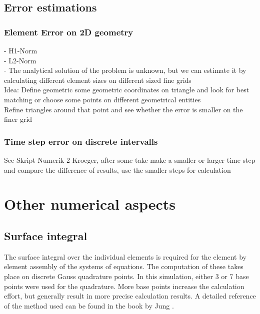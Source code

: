 \documentclass[parskip=half, titlepage=yes, 12pt, BCOR=12mm, DIV=calc]{scrartcl}
\begin{document}
\subsection{Error estimations}

\subsubsection{Element Error on 2D geometry}
- H1-Norm \\
- L2-Norm \\

- The analytical solution of the problem is unknown, but we can estimate it by calculating different element sizes on different sized fine grids \\

Idea: Define geometric some geometric coordinates on triangle and look for best matching or choose some points on different geometrical entities \\

Refine triangles around that point and see whether the error is smaller on the finer grid \\

\subsubsection{Time step error on discrete intervalls}

See Skript Numerik 2 Kroeger, after some take make a smaller or larger time step and compare the difference of results, use the smaller steps for calculation \\


\newpage


\section{Other numerical aspects }


\subsection{Surface integral}
The surface integral over the individual elements is required for the element by element assembly of the systems of equations. The computation of these takes place on discrete Gauss quadrature points. In this simulation, either 3 or 7 base points were used for the quadrature. More base points increase the calculation effort, but generally result in more precise calculation results. A detailed reference of the method used can be found in the book by Jung \cite{jung}.
\end{document}
